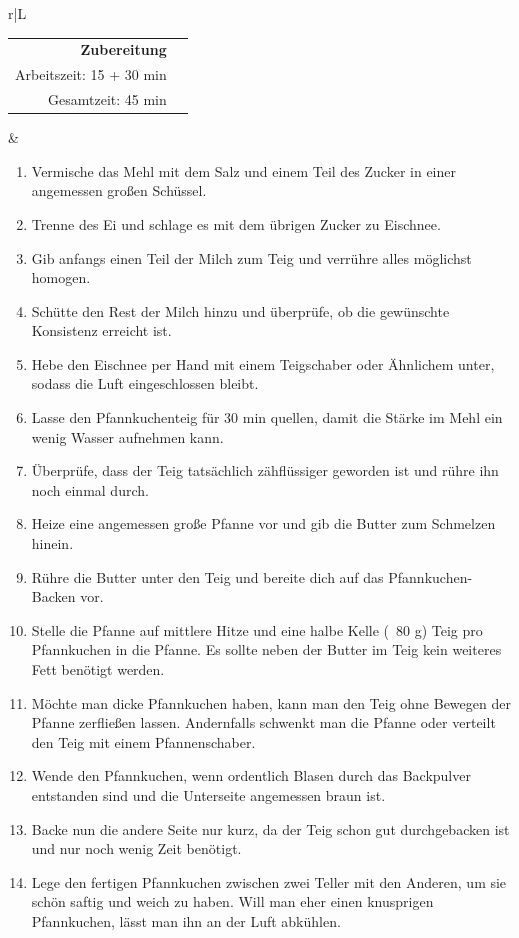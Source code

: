 \documentclass[a4paper, 12pt]{scrbook} 								%
\numberwithin{equation}{section} 									%
\begin{document}
		\begin{tabularx}{\textwidth}{r|L}
			\begin{tabular}[t]{rr}
				\textbf{Zubereitung}	\\
				Arbeitszeit: 15 + 30 min \\
				Gesamtzeit:	45 min		\\
			\end{tabular}			&	\begin{enumerate}[nosep]
											\item Vermische das Mehl mit dem Salz und einem Teil des Zucker in einer angemessen großen Schüssel.
											\item Trenne des Ei und schlage es mit dem übrigen Zucker zu Eischnee.
											\item Gib anfangs einen Teil der Milch zum Teig und verrühre alles möglichst homogen.
											\item Schütte den Rest der Milch hinzu und überprüfe, ob die gewünschte Konsistenz erreicht ist.
											\item Hebe den Eischnee per Hand mit einem Teigschaber oder Ähnlichem unter, sodass die Luft eingeschlossen bleibt.
											\item Lasse den Pfannkuchenteig für 30 min quellen, damit die Stärke im Mehl ein wenig Wasser aufnehmen kann.
											\item Überprüfe, dass der Teig tatsächlich zähflüssiger geworden ist und rühre ihn noch einmal durch.
											\item Heize eine angemessen große Pfanne vor und gib die Butter zum Schmelzen hinein.
											\item Rühre die Butter unter den Teig und bereite dich auf das Pfannkuchen-Backen vor.
											\item Stelle die Pfanne auf mittlere Hitze und eine halbe Kelle (~80 g) Teig pro Pfannkuchen in die Pfanne. Es sollte neben der Butter im Teig kein weiteres Fett benötigt werden.
											\item Möchte man dicke Pfannkuchen haben, kann man den Teig ohne Bewegen der Pfanne zerfließen lassen. Andernfalls schwenkt man die Pfanne oder verteilt den Teig mit einem Pfannenschaber.
											\item Wende den Pfannkuchen, wenn ordentlich Blasen durch das Backpulver entstanden sind und die Unterseite angemessen braun ist.
											\item Backe nun die andere Seite nur kurz, da der Teig schon gut durchgebacken ist und nur noch wenig Zeit benötigt.
											\item Lege den fertigen Pfannkuchen zwischen zwei Teller mit den Anderen, um sie schön saftig und weich zu haben. Will man eher einen knusprigen Pfannkuchen, lässt man ihn an der Luft abkühlen.
										\end{enumerate}	\\
		\end{tabularx}
\end{document}
